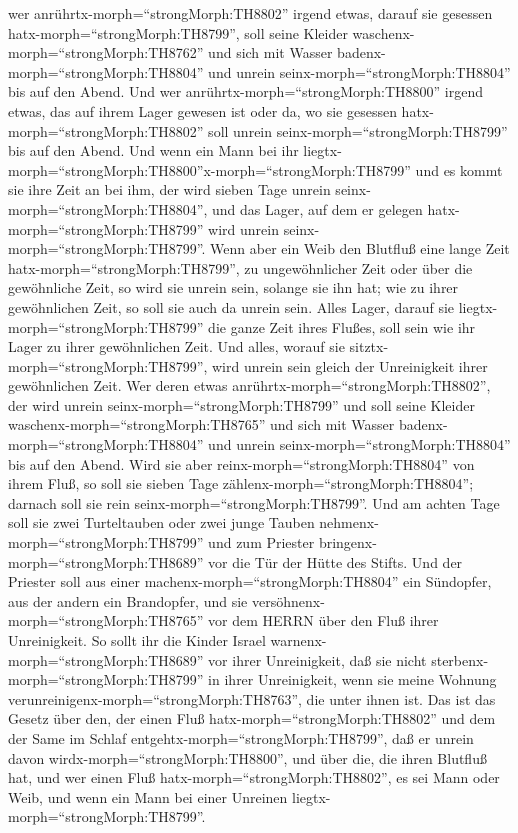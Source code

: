 wer anrührtx-morph=``strongMorph:TH8802'' irgend etwas, darauf sie
gesessen hatx-morph=``strongMorph:TH8799'', soll seine Kleider
waschenx-morph=``strongMorph:TH8762'' und sich mit Wasser
badenx-morph=``strongMorph:TH8804'' und unrein
seinx-morph=``strongMorph:TH8804'' bis auf den Abend.  Und
wer anrührtx-morph=``strongMorph:TH8800'' irgend etwas, das auf ihrem
Lager gewesen ist oder da, wo sie gesessen
hatx-morph=``strongMorph:TH8802'' soll unrein
seinx-morph=``strongMorph:TH8799'' bis auf den Abend.  Und
wenn ein Mann bei ihr
liegtx-morph=``strongMorph:TH8800''x-morph=``strongMorph:TH8799'' und es
kommt sie ihre Zeit an bei ihm, der wird sieben Tage unrein
seinx-morph=``strongMorph:TH8804'', und das Lager, auf dem er gelegen
hatx-morph=``strongMorph:TH8799'' wird unrein
seinx-morph=``strongMorph:TH8799''.  Wenn aber ein Weib den
Blutfluß eine lange Zeit hatx-morph=``strongMorph:TH8799'', zu
ungewöhnlicher Zeit oder über die gewöhnliche Zeit, so wird sie unrein
sein, solange sie ihn hat; wie zu ihrer gewöhnlichen Zeit, so soll sie
auch da unrein sein.  Alles Lager, darauf sie
liegtx-morph=``strongMorph:TH8799'' die ganze Zeit ihres Flußes, soll
sein wie ihr Lager zu ihrer gewöhnlichen Zeit. Und alles, worauf sie
sitztx-morph=``strongMorph:TH8799'', wird unrein sein gleich der
Unreinigkeit ihrer gewöhnlichen Zeit.  Wer deren etwas
anrührtx-morph=``strongMorph:TH8802'', der wird unrein
seinx-morph=``strongMorph:TH8799'' und soll seine Kleider
waschenx-morph=``strongMorph:TH8765'' und sich mit Wasser
badenx-morph=``strongMorph:TH8804'' und unrein
seinx-morph=``strongMorph:TH8804'' bis auf den Abend.  Wird
sie aber reinx-morph=``strongMorph:TH8804'' von ihrem Fluß, so soll sie
sieben Tage zählenx-morph=``strongMorph:TH8804''; darnach soll sie rein
seinx-morph=``strongMorph:TH8799''.  Und am achten Tage
soll sie zwei Turteltauben oder zwei junge Tauben
nehmenx-morph=``strongMorph:TH8799'' und zum Priester
bringenx-morph=``strongMorph:TH8689'' vor die Tür der Hütte des Stifts.
 Und der Priester soll aus einer
machenx-morph=``strongMorph:TH8804'' ein Sündopfer, aus der andern ein
Brandopfer, und sie versöhnenx-morph=``strongMorph:TH8765'' vor dem
HERRN über den Fluß ihrer Unreinigkeit.  So sollt ihr die
Kinder Israel warnenx-morph=``strongMorph:TH8689'' vor ihrer
Unreinigkeit, daß sie nicht sterbenx-morph=``strongMorph:TH8799'' in
ihrer Unreinigkeit, wenn sie meine Wohnung
verunreinigenx-morph=``strongMorph:TH8763'', die unter ihnen ist.
 Das ist das Gesetz über den, der einen Fluß
hatx-morph=``strongMorph:TH8802'' und dem der Same im Schlaf
entgehtx-morph=``strongMorph:TH8799'', daß er unrein davon
wirdx-morph=``strongMorph:TH8800'',  und über die, die
ihren Blutfluß hat, und wer einen Fluß
hatx-morph=``strongMorph:TH8802'', es sei Mann oder Weib, und wenn ein
Mann bei einer Unreinen liegtx-morph=``strongMorph:TH8799''.

